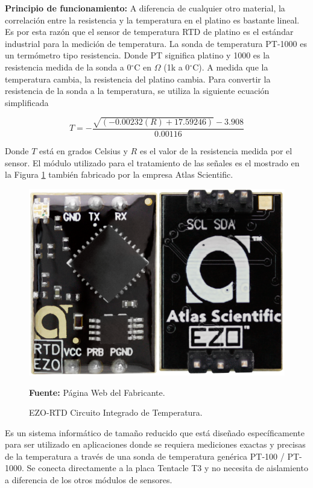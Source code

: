 \textbf{Principio de funcionamiento:}
A diferencia de cualquier otro material, la correlación entre la resistencia y la temperatura en el platino es bastante lineal. Es por esta razón que el sensor de temperatura RTD de platino es el estándar industrial para la medición de temperatura.
La sonda de temperatura PT-1000 es un term\'ometro tipo resistencia. Donde PT significa platino y 1000 es la resistencia medida de la sonda a 0$^{\circ}$C en $\Omega$ (1k a 0$^{\circ}$C).
A medida que la temperatura cambia, la resistencia del platino cambia.
Para convertir la resistencia de la sonda a la temperatura, se utiliza la siguiente ecuaci\'on simplificada

\begin{equation}
    T=-\frac{\sqrt{(-0.00232(R)+17.59246)}-3.908}{0.00116}
\end{equation}

Donde $T$ est\'a en grados Celsius y $R$ es el valor de la resistencia medida por el sensor.
El módulo utilizado para el tratamiento de las señales es el mostrado en la Figura \ref{fig:4.16} también fabricado por la empresa Atlas Scientific.

\begin{figure}[H]
    \centering
    \includegraphics[scale=0.4]{Imagenes/2021/imag38.png}
    \caption[EZO-RTD Circuito Integrado de Temperatura]{EZO-RTD Circuito Integrado de Temperatura.}{\textbf{Fuente:} P\'agina Web del Fabricante.}
    \label{fig:4.16}
\end{figure}

Es un sistema informático de tamaño reducido que está diseñado específicamente para ser utilizado en aplicaciones donde se requiera mediciones exactas y precisas de la temperatura a través de una sonda de temperatura genérica PT-100 / PT-1000. Se conecta directamente a la placa Tentacle T3 y no necesita de aislamiento a diferencia de los otros módulos de sensores.

